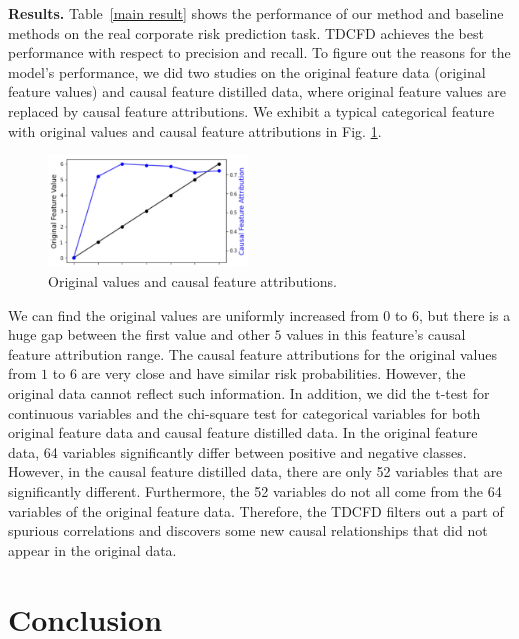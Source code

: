 \documentclass[letterpaper]{article} %
\theoremstyle{definition}
\theoremstyle{remark}
\begin{document}
\noindent\textbf{Results.} Table~\ref{main result} shows the performance of our method and baseline methods on the real corporate risk prediction task. TDCFD achieves the best performance with respect to precision and recall. To figure out the reasons for the model's performance, we did two studies on the original feature data (original feature values) and causal feature distilled data, where original feature values are replaced by causal feature attributions. We exhibit a typical categorical feature with original values and causal feature attributions in Fig. \ref{fig:compare}.
\begin{figure}
\centering
\includegraphics[width=0.63\linewidth,height=1.17in ]{compare.jpg}

\caption{Original values and causal feature attributions.}

\label{fig:compare}
\end{figure}
We can find the original values are uniformly increased from $0$ to $6$, but there is a huge gap between the first value and other $5$ values in this feature's causal feature attribution range. The causal feature attributions for the original values from $1$ to $6$ are very close and have similar risk probabilities. However, the original data cannot reflect such information. In addition, we did the t-test for continuous variables and the chi-square test for categorical variables for both original feature data and causal feature distilled data. In the original feature data, 64 variables significantly differ between positive and negative classes. However, in the causal feature distilled data, there are only 52 variables that are significantly different. Furthermore, the 52 variables do not all come from the 64 variables of the original feature data. Therefore, the TDCFD filters out a part of spurious correlations and discovers some new causal relationships that did not appear in the original data.








\vspace{-0.95mm}
\vspace{-1.63mm}
\section{Conclusion}
\end{document}

